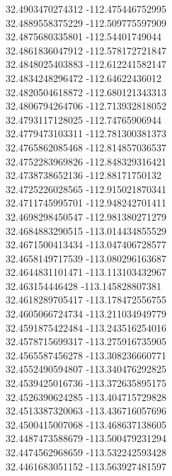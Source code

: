 {32.4903470274312	-112.475446752995\\
32.4889558375229	-112.509775597909\\
32.4875680335801	-112.54401749044\\
32.4861836047912	-112.578172721847\\
32.4848025403883	-112.612241582147\\
32.4834248296472	-112.64622436012\\
32.4820504618872	-112.680121343313\\
32.4806794264706	-112.713932818052\\
32.4793117128025	-112.74765906944\\
32.4779473103311	-112.781300381373\\
32.4765862085468	-112.814857036537\\
32.4752283969826	-112.848329316421\\
32.4738738652136	-112.88171750132\\
32.4725226028565	-112.915021870341\\
32.4711745995701	-112.948242701411\\
32.4698298450547	-112.981380271279\\
32.4684883290515	-113.014434855529\\
32.4671500413434	-113.047406728577\\
32.4658149717539	-113.080296163687\\
32.4644831101471	-113.113103432967\\
32.463154446428	-113.145828807381\\
32.4618289705417	-113.178472556755\\
32.4605066724734	-113.211034949779\\
32.4591875422484	-113.243516254016\\
32.4578715699317	-113.275916735905\\
32.4565587456278	-113.308236660771\\
32.4552490594807	-113.340476292825\\
32.4539425016736	-113.372635895175\\
32.4526390624285	-113.404715729828\\
32.4513387320063	-113.436716057696\\
32.4500415007068	-113.468637138605\\
32.4487473588679	-113.500479231294\\
32.4474562968659	-113.532242593428\\
32.4461683051152	-113.563927481597\\
}
